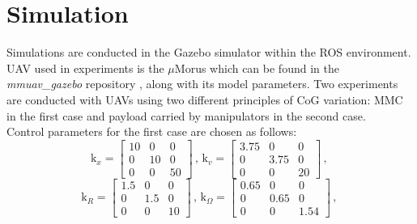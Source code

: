 \section{Simulation} \label{sec:simulation}
Simulations are conducted in the Gazebo simulator within the ROS environment. UAV used in experiments is the $\mu$Morus which can be found in the \textit{mmuav\_gazebo} repository \cite{gitLink}, along with its model parameters. Two experiments are conducted with UAVs using two different principles of CoG variation: MMC in the first case and payload carried by manipulators in the second case. \\
Control parameters for the first case are chosen as follows:
\begin{equation*}
	\text{k}_x = 
	\begin{bmatrix}
		10 &  0  &  0 \\
		 0 & 10  &	0 \\ 
		 0 &  0  & 50 	
	\end{bmatrix}
	\, , \,	
	\text{k}_v =
	\begin{bmatrix}
		3.75 & 0 & 0 \\
		0 & 3.75 & 0 \\
		0 & 0 & 20
	\end{bmatrix}
	\, , \,
\end{equation*}
\begin{equation*}
	\text{k}_R = 
	\begin{bmatrix}
		1.5 & 0 & 0 \\
		0 & 1.5 & 0 \\
		0 & 0 & 10
	\end{bmatrix}
	\, , \,
	\text{k}_\Omega = 
	\begin{bmatrix}
		0.65 & 0 & 0 \\
		0 & 0.65 & 0 \\
		0 & 0 & 1.54
	\end{bmatrix}
	\, , \,
\end{equation*}

